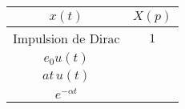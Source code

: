 ﻿\documentclass[a4paper]{article}
\begin{document}
\pagestyle{fancy}
\fancyhf{}
\setlength{\headheight}{15pt}

\begin{center}
	\large{}
\end{center}


\begin{table}[h]
	\begin{tabular}{c|c}
		\( x(t) \) & \( X(p) \) \\
		\hline
		Impulsion de Dirac & \( 1 \) \\
		\( e_0 u(t) \) & \gape{\( \dfrac{e_0}{p} \)} \\
		\( at\, u(t) \) & \gape{\( \dfrac{a}{p^2} \)} \\
		\( e^{-\alpha t} \) & \gape{\( \dfrac{1}{p+\alpha} \)}
	\end{tabular}
\end{table}
\end{document}

